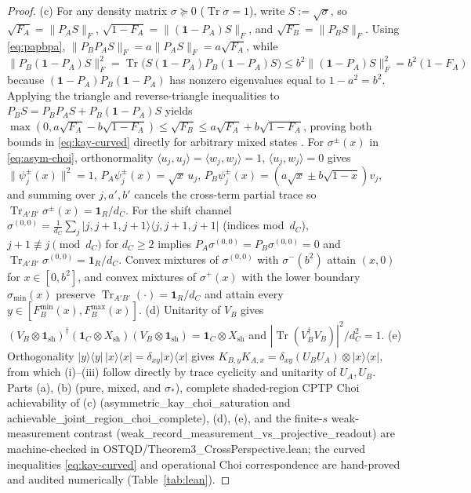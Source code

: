 \documentclass[11pt,a4paper]{article}
\theoremstyle{definition}
\theoremstyle{remark}
\newcommand{\Tr}{\operatorname{Tr}}
\newcommand{\1}{\mathbf{1}}
\newcommand{\normF}[1]{\|#1\|_F}
\newcommand{\code}[1]{{\footnotesize\ttfamily #1}}
\begin{document}
\begin{proof}
(c) For any density matrix $\sigma \succeq 0$ ($\Tr\sigma=1$), write $S := \sqrt{\sigma}$, so $\sqrt{F_A} = \normF{P_A S}$, $\sqrt{1-F_A} = \normF{(\1-P_A)S}$, and $\sqrt{F_B} = \normF{P_B S}$. Using \eqref{eq:papbpa}, $\normF{P_B P_A S} = a\normF{P_A S} = a\sqrt{F_A}$, while $\normF{P_B(\1-P_A)S}^2 = \allowbreak \Tr\bigl(S(\1-P_A)P_B(\1-P_A)S\bigr) \le \allowbreak b^2\normF{(\1-P_A)S}^2 = b^2(1-F_A)$ because $(\1-P_A)P_B(\1-P_A)$ has nonzero eigenvalues equal to $1 - a^2 = b^2$. Applying the triangle and reverse-triangle inequalities to $P_B S = P_B P_A S + P_B(\1-P_A)S$ yields $\max(0, a\sqrt{F_A} - b\sqrt{1-F_A}) \le \allowbreak \sqrt{F_B} \le \allowbreak a\sqrt{F_A} + b\sqrt{1-F_A}$, proving both bounds in \eqref{eq:kay-curved} directly for arbitrary mixed states \cite{Kay2009,Nechita2021}. For $\sigma^\pm(x)$ in \eqref{eq:asym-choi}, orthonormality $\langle u_j, u_j\rangle = \langle w_j, w_j\rangle = 1$, $\langle u_j, w_j\rangle = 0$ gives $\|\psi_j^\pm(x)\|^2=1$, $P_A\psi_j^\pm(x) = \sqrt{x}\,u_j$, $P_B\psi_j^\pm(x) = (a\sqrt{x}\pm b\sqrt{1-x})v_j$, and summing over $j,a',b'$ cancels the cross-term partial trace so $\Tr_{A'B'}\sigma^\pm(x) = \1_R/d_C$. For the shift channel $\sigma^{(0,0)} = \frac{1}{d_C}\sum_j |j,j+1,j+1\rangle\langle j,j+1,j+1|$ (indices mod~$d_C$), $j+1\not\equiv j\pmod{d_C}$ for $d_C\ge 2$ implies $P_A\sigma^{(0,0)}=P_B\sigma^{(0,0)}=0$ and $\Tr_{A'B'}\sigma^{(0,0)}=\1_R/d_C$. Convex mixtures of $\sigma^{(0,0)}$ with $\sigma^-(b^2)$ attain $(x,0)$ for $x\in[0,b^2]$, and convex mixtures of $\sigma^+(x)$ with the lower boundary $\sigma_{\min}(x)$ preserve $\Tr_{A'B'}(\cdot)=\1_R/d_C$ and attain every $y\in[F_B^{\min}(x),F_B^{\max}(x)]$.
(d) Unitarity of $V_B$ gives $(V_B\otimes\1_{\mathrm{sh}})^\dagger(\1_C\otimes X_{\mathrm{sh}})(V_B\otimes\1_{\mathrm{sh}}) = \1_C\otimes X_{\mathrm{sh}}$ and $|\Tr(V_B^\dagger V_B)|^2/d_C^2 = 1$.
(e) Orthogonality $|y\rangle\langle y|\,|x\rangle\langle x| = \delta_{xy}|x\rangle\langle x|$ gives $K_{B,y}K_{A,x} = \delta_{xy}(U_B U_A)\otimes |x\rangle\langle x|$, from which (i)--(iii) follow directly by trace cyclicity and unitarity of $U_A, U_B$. Parts (a), (b) (pure, mixed, and $\sigma_*$), complete shaded-region CPTP Choi achievability of (c) (\code{asymmetric\_\allowbreak kay\_\allowbreak choi\_\allowbreak saturation} and \code{achievable\_\allowbreak joint\_\allowbreak region\_\allowbreak choi\_\allowbreak complete}), (d), (e), and the finite-$s$ weak-measurement contrast (\code{weak\_\allowbreak record\_\allowbreak measurement\_\allowbreak vs\_\allowbreak projective\_\allowbreak readout}) are machine-checked in \code{OSTQD/\allowbreak Theorem3\_\allowbreak CrossPerspective.lean}; the curved inequalities \eqref{eq:kay-curved} and operational Choi correspondence are hand-proved and audited numerically (Table~\ref{tab:lean}).
\end{proof}
\end{document}
